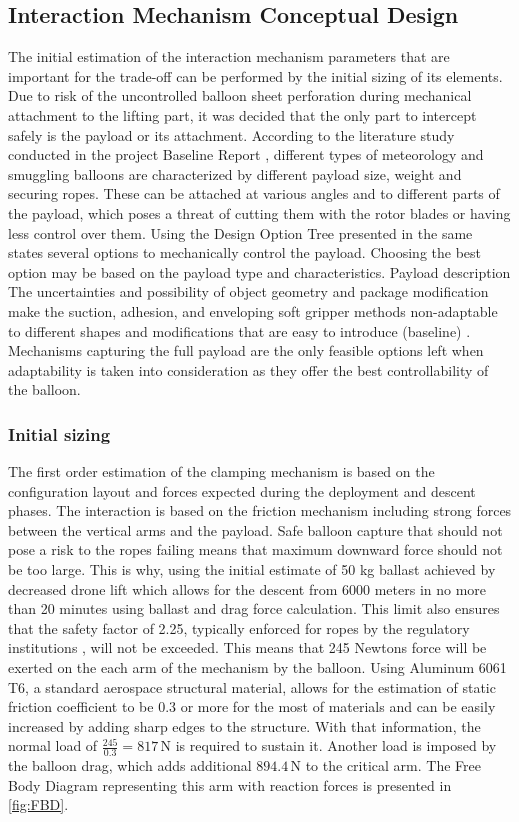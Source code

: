 \subsection{Interaction Mechanism Conceptual Design}
The initial estimation of the interaction mechanism parameters that are important for the trade-off can be performed by the initial sizing of its elements. Due to risk of the uncontrolled balloon sheet perforation during mechanical attachment to the lifting part, it was decided that the only part to intercept safely is the payload or its attachment. According to the literature study conducted in the project Baseline Report \cite{}, different types of meteorology and smuggling balloons are characterized by different payload size, weight and securing ropes. These can be attached at various angles and to different parts of the payload, which poses a threat of cutting them with the rotor blades or having less control over them. Using the Design Option Tree presented in the same states several options to mechanically control the payload. Choosing the best option may be based on the payload type and characteristics.  \newline
Payload description \newline
The uncertainties and possibility of object geometry and package modification make the suction, adhesion, and enveloping soft gripper  methods non-adaptable to different shapes and modifications that are easy to introduce (baseline) \cite{}. Mechanisms capturing the full payload are the only feasible options left when adaptability is taken into consideration as they offer the best controllability of the balloon. 
\subsubsection{Initial sizing}
The first order estimation of the clamping mechanism is based on the configuration layout and forces expected during the deployment and descent phases. The interaction is based on the friction mechanism including strong forces between the vertical arms and the payload. Safe balloon capture that should not pose a risk to the ropes failing means that maximum downward force should not be too large. This is why, using the initial estimate of 50 kg ballast achieved by decreased drone lift which allows for the descent from 6000 meters in no more than 20 minutes using ballast and drag force calculation. This limit also ensures that the safety factor of 2.25, typically enforced for ropes by the regulatory institutions \cite{EASA2009EuropeanCS-31HB}, will not be exceeded. This means that 245 Newtons force will be exerted on the each arm of the mechanism by the balloon. Using Aluminum 6061 T6, a standard aerospace structural material, allows for the estimation of static friction coefficient to be 0.3 or more for the most of materials and can be easily increased by adding sharp edges to the structure. With that information, the normal load of $
\frac{245}{0.3}=817 \, \text{N}$ is required to sustain it. Another load is imposed by the balloon drag, which adds additional $894.4 \, \text{N}$ to the critical arm. The Free Body Diagram representing this arm with reaction forces is presented in \autoref{fig:FBD}.

